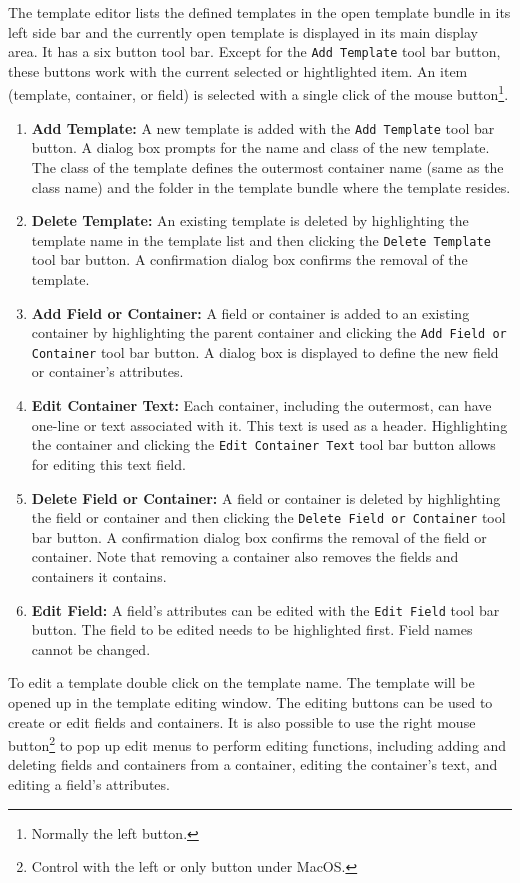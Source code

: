 The template editor lists the defined templates in the open template
bundle in its left side bar and the currently open template is
displayed in its main display area.  It has a six button tool bar.
Except for the \verb=Add Template= tool bar button, these buttons work
with the current selected or hightlighted item.  An item (template,
container, or field) is selected with a single click of the mouse
button\footnote{Normally the left button.}.


\begin{enumerate}
\item \textbf{Add Template:} A new template is added with the 
\verb=Add Template= tool bar button.  A dialog box prompts for the name
and class of the new template.  The class of the template defines the
outermost container name (same as the class name) and the folder in the
template bundle where the template resides. 
\item \textbf{Delete Template:} An existing template is deleted by
highlighting the template name in the template list and then clicking
the \verb=Delete Template= tool bar button.  A confirmation dialog box
confirms the removal of the template. 
\item \textbf{Add Field or Container:} A field or container is added to
an existing container by highlighting the parent container and clicking
the \verb=Add Field or Container= tool bar button.  A dialog box is
displayed to define the new field or container's attributes. 
\item \textbf{Edit Container Text:} Each container, including the
outermost, can have one-line or text associated with it.  This text is
used as a header.  Highlighting the container and clicking the
\verb=Edit Container Text= tool bar button allows for editing this text
field. 
\item \textbf{Delete Field or Container:} A field or container is
deleted by highlighting the field or container and then clicking the
\verb=Delete Field or Container= tool bar button.  A confirmation
dialog box confirms the removal of the field or container. Note that
removing a container also removes the fields and containers it
contains. 
\item \textbf{Edit Field:} A field's attributes can be edited with the
\verb=Edit Field= tool bar button.  The field to be edited needs to be
highlighted first.  Field names cannot be changed.
\end{enumerate}

To edit a template double click on the template name.  The template
will be opened up in the template editing window. The editing buttons
can be used to create or edit fields and containers.  It is also
possible to use the right mouse button\footnote{Control with the left
or only button under MacOS.} to pop up edit menus to perform editing
functions, including adding and deleting fields and containers from a
container, editing the container's text, and editing a field's
attributes.

